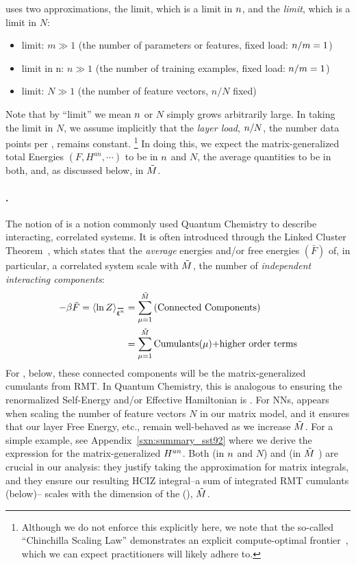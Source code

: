 \SETOL uses two \LargeN approximations, the \Thermodynamic limit, which is a \LargeN limit in $n$, and the \emph{\WideLayer limit}, which is a \LargeN limit in $N$:
\begin{itemize}
    \item \Thermodynamic limit: $m \gg 1$ (the number of parameters or features, fixed load: $n/m = 1$)
    \item \LargeN limit in n: $n\gg 1$ (the number of training examples, fixed load: $n/m = 1$)
    \item \WideLayer limit: $N\gg 1$ (the number of feature vectors,  $n/N$ fixed)
\end{itemize}
Note that by ``limit'' we mean $n$ or $N$ simply grows arbitrarily large. In taking the \WideLayer \LargeN limit in $N$, we assume implicitly that  the \emph{layer load}, $n/N$, the number data points per , remains constant. \footnote{Although we do not enforce this explicitly here, we note that the so-called ``Chinchilla Scaling Law'' demonstrates an explicit compute-optimal frontier~\cite{hoffmann2022}, which we can expect practitioners will likely adhere to.}  
In doing this, we expect the matrix-generalized total Energies $(F, H^{an}, \cdots)$ to be \SizeExtensive in $n$ and $N$, the average quantities to be \SizeIntensive in both, 
and, as discussed below, \emph{\SizeConsistent} in $\tilde{M}$.

\paragraph{\SizeConsistency.}
The notion of \emph{\SizeConsistency} is a notion commonly 
used Quantum Chemistry to describe interacting, correlated systems. It is often introduced through the Linked Cluster Theorem~\cite{Hubbard1959,Brandow1963},
which states that the \emph{average} energies and/or free energies $(\bar{F})$ of, in particular, a correlated system scale with $\tilde{M}$,
the number of \emph{independent interacting components}:
\begin{align}
  \label{eqn:LCT}
  -\beta \bar{F}=\langle \ln Z \rangle_{\AVGNDXIn} &= \sum_{\mu=1}^{\MECS}\text{(Connected Components)} \nonumber \\
  &= \sum_{\mu=1}^{\MECS}\text{Cumulants($\mu$)+higher order terms} 
\end{align}
For \SETOL, below, these connected components will be the matrix-generalized cumulants from RMT.
In Quantum Chemistry, this is analogous to ensuring the renormalized Self-Energy and/or Effective Hamiltonian is \SizeConsistent.
For NNs, \SizeConsistency appears when scaling the number of feature vectors $N$ in our matrix model,
and it ensures that our layer Free Energy, etc., remain well-behaved as we increase $\tilde{M}$.
For a simple example, see Appendix~\ref{sxn:summary_sst92}
 where we derive the expression for the matrix-generalized
\AnnealedHamiltonian $H^{an}$.  
Both \SizeExtensivity (in $n$ and $N$) and \SizeConsistency (in $\tilde{M}$ )
are crucial in our \SETOL analysis: they justify taking the \LargeN approximation for matrix integrals, and they ensure
our resulting HCIZ integral--a sum of integrated RMT cumulants (below)--
scales with the dimension of the \EffectiveCorrelationSpace (\ECS), $\tilde{M}$.  



